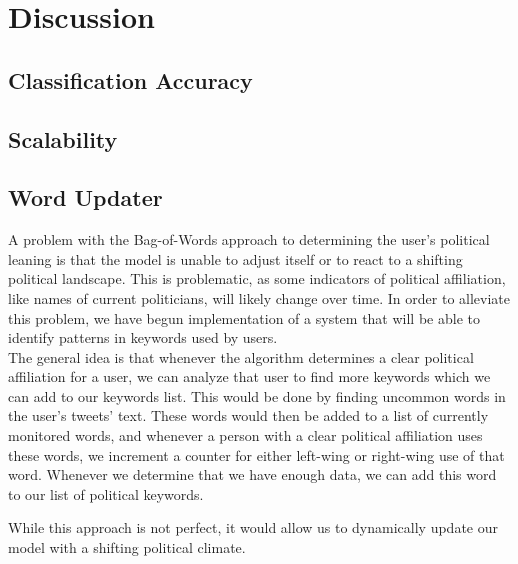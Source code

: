 \chapter{Discussion}\label{cha:disc}

\section{Classification Accuracy}

\section{Scalability}

\section{Word Updater}
A problem with the Bag-of-Words approach to determining the user's political
leaning is that the model is unable to adjust itself or to react to a shifting
political landscape. This is problematic, as some indicators of political
affiliation, like names of current politicians, will likely change over time. In
order to alleviate this problem, we have begun implementation of a system that
will be able to identify patterns in keywords used by users.\\ 
The general idea is that whenever the algorithm determines a clear political
affiliation for a user, we can analyze that user to find more keywords which we
can add to our keywords list. This would be done by finding uncommon words in
the user's tweets' text. These words would then be added to a list of currently
monitored words, and whenever a person with a clear political affiliation uses
these words, we increment a counter for either left-wing or right-wing use of
that word. Whenever we determine that we have enough data, we can add this word
to our list of political keywords.\nl

While this approach is not perfect, it would allow us to dynamically update our
model with a shifting political climate.
